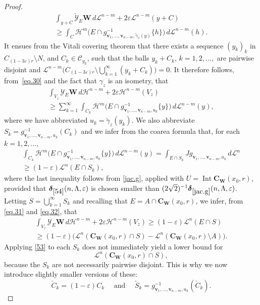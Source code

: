 \documentclass[JEP,XML,SOM,Unicode,ThmDefs,NoEqCountersInSection]{cedram}
\newcommand{\calC}{\mathscr{C}}
\newcommand{\calH}{\mathscr{H}}
\newcommand{\calL}{\mathscr{L}}
\newcommand{\calY}{\mathscr{Y}}
\newcommand{\bdelta}{\boldsymbol{\delta}}
\newcommand{\bC}{{\boldsymbol{C}}}
\newcommand{\bW}{{\boldsymbol{W}}}
\newcommand{\bv}{{\boldsymbol{v}}}
\DeclareMathOperator{\rmInt}{\mathrm{Int}}
\let\veps\varepsilon
\begin{document}
\begin{proof}
\begin{multline}
\label{eq.30}
\int_{y + C} \check{\calY}_E \bW \,d\calL^{n-m} + 2\veps \calL^{n-m}(y+C)\\[-5pt]
\geq \int_C \calH^m \bigl(E \cap g_{\bv_1,\ldots,\bv_{n-m},\check{\gamma}_z(y)}^{-1}\{h\} \bigr) \,d\calL^{n-m}(h).
\end{multline}
It ensues from the Vitali covering theorem that there exists a sequence $(y_k)_k$ in \hbox{$C_{(1-3\veps)r}\!\setminus\!N$}, and $C_k \in \calC_{y_k}$, such that the balls $y_k + C_k$, $k=1,2,\ldots,$ are pairwise disjoint and $\calL^{n-m} \bigl(C_{(1-3\veps)r} \setminus \bigcup_{k=1}^\infty (y_k+C_k) \bigr) = 0$.
It therefore follows, from~\eqref{eq.30} and the fact that $\gamma_z$ is an isometry, that\vspace*{-5pt}
\begin{multline}
\label{eq.31}
\int_{V_z} \calY_E \bW \,d\calH^{n-m} +2\veps \calH^{n-m}(V_z)\\[-5pt]
\geq \sum_{k=1}^\infty \int_{C_k} \calH^m \bigl(E \cap g_{\bv_1,\ldots,\bv_{n-m},u_k}^{-1}\{y\} \bigr) \,d\calL^{n-m}(y),
\end{multline}
where we have abbreviated $u_k = \check{\gamma}_z(y_k)$.
We also abbreviate $S_k = g_{\bv_1,\ldots,\bv_{n-m},u_k}^{-1}(C_k)$ and we infer from the coarea formula that, for each $k=1,2,\ldots$,
\begin{multline}
\label{eq.32}
\int_{C_k} \calH^m \bigl(E \cap g_{\bv_1,\ldots,\bv_{n-m},u_k}^{-1}\{y\} \bigr) \,d\calL^{n-m}(y) = \int_{E \cap S_k} Jg_{\bv_1,\ldots,\bv_{n-m},u_k}\,d\calL^n \\
\geq (1-\veps) \calL^n(E \cap S_k),
\end{multline}
where the last inequality follows from \ref{jac.g}, applied with $U = \rmInt \bC_\bW(x_0,r)$, provided that $\bdelta_{\ref{54}}(n,\Lambda,\veps)$ is chosen smaller than $(2\sqrt{2})^{-1}\bdelta_{\ref{jac.g}}(n,\Lambda,\veps)$.
Letting $S = \bigcup_{k=1}^\infty S_k$ and recalling that $E = A \cap \bC_\bW(x_0,r)$, we infer, from \eqref{eq.31} and \eqref{eq.32}, that
\begin{multline}
\label{eq.33}
\int_{V_z} \calY_E \bW \,d\calH^{n-m} +2\veps \calH^{n-m}(V_z) \geq (1-\veps) \calL^n(E \cap S) \\
\geq (1-\veps) \big(\calL^n (\bC_\bW(x_0,r) \cap S) - \calL^n(\bC_\bW(x_0,r) \setminus A) \big).
\end{multline}
Applying \ref{53} to each $S_k$ does not immediately yield a lower bound for
\[
\calL^n (\bC_\bW(x_0,r) \cap S),
\]
because the $S_k$ are not necessarily pairwise disjoint.
This is why we now introduce slightly smaller versions of these:
\begin{equation*}
\check{C}_k = (1-\veps) C_k \quad \text{ and } \quad \check{S}_k = g_{\bv_1,\ldots,\bv_{n-m},u_k}^{-1}(\check{C}_k).
\end{equation*}


\end{proof}
\end{document}
